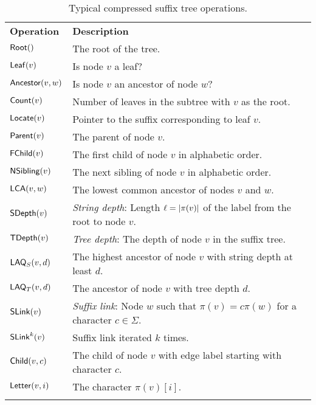 \begin{table}
\centering{}
\caption{Typical compressed suffix tree operations.}\label{table:cst
operations}

\begin{tabular}{ll}
\hline
\noalign{\smallskip}
\textbf{Operation}  & \textbf{Description} \\
\noalign{\smallskip}
\hline
\noalign{\smallskip}
$\mathsf{Root}()$          & The root of the tree. \\
$\mathsf{Leaf}(v)$         & Is node $v$ a leaf? \\
$\mathsf{Ancestor}(v,w)$   & Is node $v$ an ancestor of node $w$? \\
\noalign{\smallskip}
$\mathsf{Count}(v)$        & Number of leaves in the subtree with $v$ as the root. \\
$\mathsf{Locate}(v)$       & Pointer to the suffix corresponding to leaf $v$. \\
\noalign{\smallskip}
$\mathsf{Parent}(v)$       & The parent of node $v$. \\
$\mathsf{FChild}(v)$       & The first child of node $v$ in alphabetic order. \\
$\mathsf{NSibling}(v)$     & The next sibling of node $v$ in alphabetic order. \\
$\mathsf{LCA}(v,w)$        & The lowest common ancestor of nodes $v$ and $w$. \\
\noalign{\smallskip}
$\mathsf{SDepth}(v)$       & \emph{String depth}: Length $\ell = \lvert \pi(v) \rvert$ of the
label from the root to node $v$. \\
$\mathsf{TDepth}(v)$       & \emph{Tree depth}: The depth of node $v$ in the suffix
tree. \\
$\mathsf{LAQ}_{S}(v,d)$    & The highest ancestor of node $v$ with string depth at
least $d$. \\
$\mathsf{LAQ}_{T}(v,d)$    & The ancestor of node $v$ with tree depth $d$. \\
\noalign{\smallskip}
$\mathsf{SLink}(v)$        & \emph{Suffix link}: Node $w$ such that $\pi(v) = c \pi(w)$ for
a character $c \in \Sigma$. \\
$\mathsf{SLink}^{k}(v)$    & Suffix link iterated $k$ times. \\
\noalign{\smallskip}
$\mathsf{Child}(v,c)$      & The child of node $v$ with edge label starting with
character $c$. \\
$\mathsf{Letter}(v,i)$     & The character $\pi(v)[i]$. \\
\noalign{\smallskip}
\hline
\end{tabular}
\end{table}

